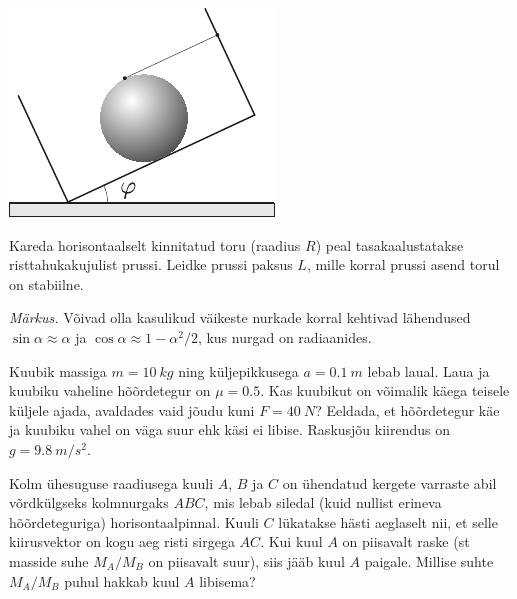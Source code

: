 \documentclass[10pt]{article}
\begin{document}
{\begin{center}
	\includegraphics[width=0.5\linewidth]{2006-lahg-07-yl}
\end{center}
\probend
\bigskip


Kareda horisontaalselt kinnitatud toru (raadius $R$) peal tasakaalustatakse risttahukakujulist prussi. Leidke prussi paksus $L$, mille
korral prussi asend torul on stabiilne.

\emph{Märkus.} Võivad olla kasulikud väikeste nurkade korral kehtivad lähendused
$\sin\alpha\approx \alpha$ ja $\cos\alpha\approx 1-\alpha^2/2$, kus nurgad on radiaanides.
\probend
\bigskip


Kuubik massiga $m = \SI{10}{kg}$ ning küljepikkusega $a = \SI{0,1}{m}$ lebab laual. Laua ja kuubiku vaheline hõõrdetegur on $\mu = \num{0,5}$. Kas kuubikut on võimalik käega teisele küljele ajada, avaldades vaid jõudu kuni $F = \SI{40}{N}$? Eeldada, et hõõrdetegur käe ja kuubiku vahel on väga suur ehk käsi ei libise. Raskusjõu kiirendus on $g = \SI{9,8}{m/s^2}$.
\probend
\bigskip


Kolm ühesuguse raadiusega kuuli $A$, $B$ ja $C$ on ühendatud kergete varraste abil võrdkülgseks kolmnurgaks $ABC$, mis lebab siledal (kuid nullist erineva hõõrdeteguriga) horisontaalpinnal. Kuuli $C$ lükatakse hästi aeglaselt nii, et selle kiirusvektor on kogu aeg risti sirgega $AC$. Kui kuul $A$ on piisavalt raske (st masside suhe $M_A/M_B$ on piisavalt suur), siis jääb kuul $A$ paigale. Millise suhte $M_A/M_B$ puhul hakkab kuul $A$ libisema?
\probend
\bigskip

}
\end{document}

